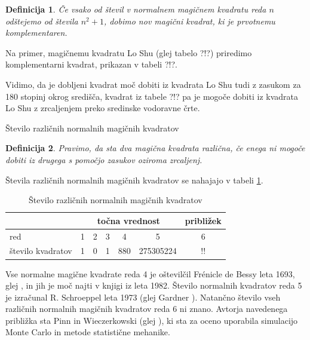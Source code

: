 \documentclass[a4paper,12pt]{article}
\newtheorem{definicija}{Definicija}}
\begin{document}
\begin{definicija}
      Če vsako od števil v normalnem magičnem kvadratu reda $n$ odštejemo
      od števila $n^2+1$, dobimo nov magični kvadrat, ki je prvotnemu
      \emph{komplementaren}.
\end{definicija}

Na primer, magičnemu kvadratu Lo Shu (glej tabelo ?!?) priredimo
komplementarni kvadrat, prikazan v tabeli ?!?.
%

Vidimo, da je dobljeni kvadrat moč dobiti iz kvadrata Lo Shu tudi z zasukom za
180 stopinj okrog središča, kvadrat iz tabele ?!? pa je mogoče dobiti
iz kvadrata Lo Shu z zrcaljenjem preko sredinske vodoravne črte.

Število različnih normalnih magičnih kvadratov

\begin{definicija}
      Pravimo, da sta dva magična kvadrata \emph{različna}, če enega ni mogoče dobiti
      iz drugega s pomočjo zasukov oziroma zrcaljenj.
\end{definicija}

Števila različnih normalnih magičnih kvadratov se nahajajo v tabeli \ref{tabele:stevila}.



\begin{table}
   \centering
   \caption{Število različnih normalnih magičnih kvadratov}
   \label{tabele:stevila}
\begin{tabular}{lcccccc}\toprule

   &\multicolumn{5}{c}{točna vrednost} &približek \\ 
    \midrule   red & 1 & 2 & 3 & 4 & 5 & 6 \\ 
   število kvadratov & 1 & 0 & 1 & 880 & 275305224 & !! \\ 
   \bottomrule
\end{tabular}
\end{table}




Vse normalne magične kvadrate reda 4 je oštevilčil Frénicle de Bessy
leta 1693, glej \cite{bessy}, in jih je moč najti v knjigi \cite{berlekamp}
iz leta 1982. Število normalnih kvadratov reda 5 je izračunal
R. Schroeppel leta 1973 (glej Gardner \cite{gardner}).
Natančno število vseh različnih normalnih magičnih kvadratov reda 6 ni znano.
Avtorja navedenega približka sta Pinn in Wieczerkowski (glej \cite{pinn}), ki
sta za oceno uporabila simulacijo Monte Carlo in metode statistične mehanike.
\end{document}
